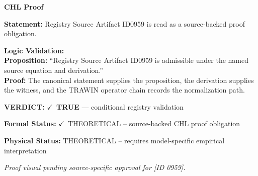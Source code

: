 \vspace{0.45em}
\noindent\textbf{CHL Proof}\par
\textbf{Statement:} Registry Source Artifact ID0959 is read as a source-backed proof obligation.

\textbf{Logic Validation:}\\
\textbf{Proposition:} ``Registry Source Artifact ID0959 is admissible under the named source equation and derivation.''\\
\textbf{Proof:} The canonical statement supplies the proposition, the derivation supplies the witness, and the TRAWIN operator chain records the normalization path.

\textbf{VERDICT:} \ensuremath{\checkmark}\ \textbf{TRUE} --- conditional registry validation

\textbf{Formal Status:} \ensuremath{\checkmark}\ THEORETICAL -- source-backed CHL proof obligation

\textbf{Physical Status:} THEORETICAL -- requires model-specific empirical interpretation
\par\vspace{0.45em}
\par
\vfill
\begingroup\footnotesize\itshape
Proof visual pending source-specific approval for [ID 0959].
\par\endgroup
\vfill
\endgroup
\endgroup
